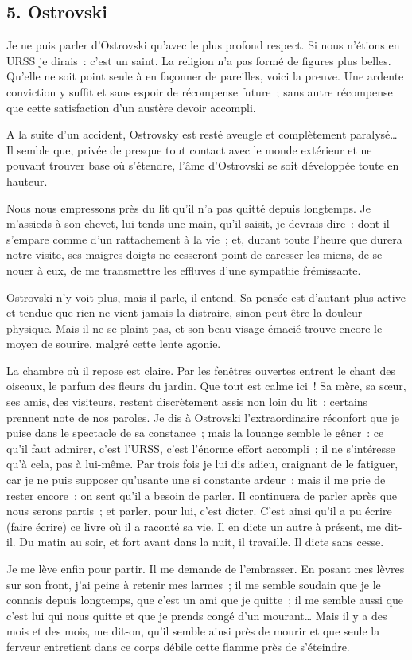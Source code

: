 \documentclass[french,twoside]{book} %
\begin{document}
\subsection[{5. Ostrovski}]{5. Ostrovski}
\noindent Je ne puis parler d’Ostrovski qu’avec le plus profond respect. Si nous n’étions en URSS je dirais : c’est un saint. La religion n’a pas formé de figures plus belles. Qu’elle ne soit point seule à en façonner de pareilles, voici la preuve. Une ardente conviction y suffit et sans espoir de récompense future ; sans autre récompense que cette satisfaction d’un austère devoir accompli.\par
A la suite d’un accident, Ostrovsky est resté aveugle et complètement paralysé… Il semble que, privée de presque tout contact avec le monde extérieur et ne pouvant trouver base où s’étendre, l’âme d’Ostrovski se soit développée toute en hauteur.\par
Nous nous empressons près du lit qu’il n’a pas quitté depuis longtemps. Je m’assieds à son chevet, lui tends une main, qu’il saisit, je devrais dire : dont il s’empare comme d’un rattachement à la vie ; et, durant toute l’heure que durera notre visite, ses maigres doigts ne cesseront point de caresser les miens, de se nouer à eux, de me transmettre les effluves d’une sympathie frémissante.\par
Ostrovski n’y voit plus, mais il parle, il entend. Sa pensée est d’autant plus active et tendue que rien ne vient jamais la distraire, sinon peut-être la douleur physique. Mais il ne se plaint pas, et son beau visage émacié trouve encore le moyen de sourire, malgré cette lente agonie.\par
La chambre où il repose est claire. Par les fenêtres ouvertes entrent le chant des oiseaux, le parfum des fleurs du jardin. Que tout est calme ici ! Sa mère, sa sœur, ses amis, des visiteurs, restent discrètement assis non loin du lit ; certains prennent note de nos paroles. Je dis à Ostrovski l’extraordinaire réconfort que je puise dans le spectacle de sa constance ; mais la louange semble le gêner : ce qu’il faut admirer, c’est l’URSS, c’est l’énorme effort accompli ; il ne s’intéresse qu’à cela, pas à lui-même. Par trois fois je lui dis adieu, craignant de le fatiguer, car je ne puis supposer qu’usante une si constante ardeur ; mais il me prie de rester encore ; on sent qu’il a besoin de parler. Il continuera de parler après que nous serons partis ; et parler, pour lui, c’est dicter. C’est ainsi qu’il a pu écrire (faire écrire) ce livre où il a raconté sa vie. Il en dicte un autre à présent, me dit-il. Du matin au soir, et fort avant dans la nuit, il travaille. Il dicte sans cesse.\par
Je me lève enfin pour partir. Il me demande de l’embrasser. En posant mes lèvres sur son front, j’ai peine à retenir mes larmes ; il me semble soudain que je le connais depuis longtemps, que c’est un ami que je quitte ; il me semble aussi que c’est lui qui nous quitte et que je prends congé d’un mourant… Mais il y a des mois et des mois, me dit-on, qu’il semble ainsi près de mourir et que seule la ferveur entretient dans ce corps débile cette flamme près de s’éteindre.
\end{document}
